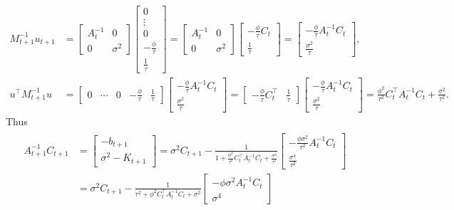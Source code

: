 \begin{align*}
M_{t+1}^{-1} u_{t+1} &=\left[ \begin{array}{cc} A_{t}^{-1} & 0 \\ 0 & \sigma^2 \end{array} \right] \left[ \begin{array}{c}  0 \\ \vdots \\0 \\ -\frac{\phi}{\tau} \\\frac{1}{\tau} \end{array} \right] =
\left[ \begin{array}{cc} A_{t}^{-1} & 0 \\ 0 & \sigma^2 \end{array} \right] \left[ \begin{array}{c} -\frac{\phi}{\tau} C_t \\ \frac{1}{\tau}\end{array} \right] = \left[ \begin{array}{c} -\frac{\phi}{\tau} A_{t}^{-1}C_t \\ \frac{\sigma^2}{\tau}\end{array} \right] ,\\
u^\top M_{t+1}^{-1}  u &=\left[ \begin{array}{ccccc}  0 & \cdots & 0 & -\frac{\phi}{\tau} & \frac{1}{\tau} \end{array} \right] \left[ \begin{array}{c} -\frac{\phi}{\tau} A_{t}^{-1}C_t \\ \frac{\sigma^2}{\tau} \end{array} \right] =  \left[ \begin{array}{cc} -\frac{\phi}{\tau} C_t^\top & \frac{1}{\tau}\end{array} \right]  \left[ \begin{array}{c} -\frac{\phi}{\tau} A_{t}^{-1}C_t \\ \frac{\sigma^2}{\tau}\end{array} \right] =\frac{\phi^2}{\tau^2} C_t^\top A_{t}^{-1}C_t+\frac{\sigma^2}{\tau^2}.
\end{align*}
Thus
\begin{align}
\begin{split}
A_{t+1}^{-1}C_{t+1} &= \left[ \begin{array}{c} -b_{t+1} \\ \sigma^2-K_{t+1}\end{array} \right] = \sigma^2C_{t+1}-\frac{1}{1+\frac{\phi^2}{\tau^2} C_t^\top A_{t}^{-1}C_t+\frac{\sigma^2}{\tau^2}} \left[\begin{array}{c} -\frac{\phi\sigma^2}{\tau^2} A_{t}^{-1}C_t \\\frac{\sigma^4}{\tau^2} \end{array}\right] \\
&= \sigma^2C_{t+1}-\frac{1}{\tau^2+\phi^2C_t^\top A_{t}^{-1}C_t+\sigma^2} \left[\begin{array}{c} -\phi\sigma^2 A_{t}^{-1}C_t \\ \sigma^4 \end{array}\right]
\end{split}
\end{align}
